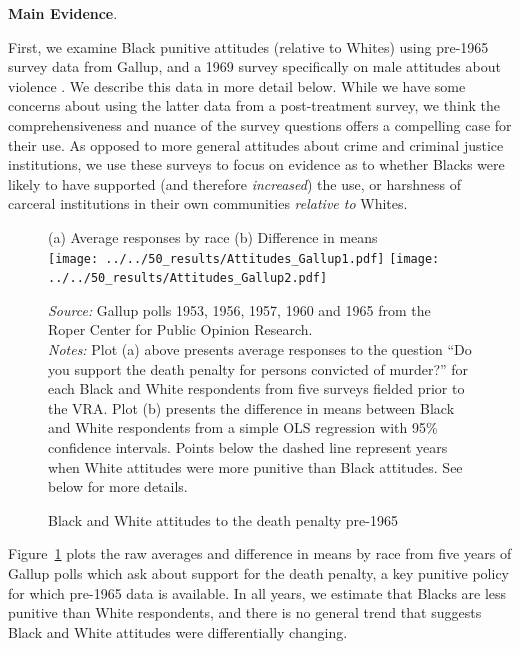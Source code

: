 \documentclass[12pt]{article}
\begin{document}
\vspace{.25in}
\textbf{Main Evidence}.

First, we examine Black punitive attitudes (relative to Whites) using pre-1965 survey data from Gallup, and a 1969 survey specifically on male attitudes about violence \citep{Violence1969}.  We describe this data in more detail below.  While we have some concerns about using the latter data from a post-treatment survey, we think the comprehensiveness and nuance of the survey questions offers a compelling case for their use.  As opposed to more general attitudes about crime and criminal justice institutions, we use these surveys to focus on evidence as to whether Blacks were likely to have supported (and therefore \emph{increased}) the use, or harshness of carceral institutions in their own communities \emph{relative to} Whites.

\begin{figure}[h!]
 \begin{center}
 \caption{Black and White attitudes to the death penalty pre-1965}
 \smallskip \smallskip
 \small
 			(a) Average responses by race  \hspace*{1.2in} (b) Difference in means \\

			\texttt{[image: ../../50\_results/Attitudes\_Gallup1.pdf]}
			\texttt{[image: ../../50\_results/Attitudes\_Gallup2.pdf]} \\
			\label{figure_attitudes1}
			 \end{center}
{\scriptsize{\emph{Source:} Gallup polls 1953, 1956, 1957, 1960 and 1965 from the Roper Center for Public Opinion Research.  }} \\
{\scriptsize{\emph{Notes:} Plot (a) above presents average responses to the question ``Do you support the death penalty for persons convicted of murder?'' for each Black and White respondents from five surveys fielded prior to the VRA.  Plot (b) presents the difference in means between Black and White respondents from a simple OLS regression with 95\% confidence intervals.  Points below the dashed line represent years when White attitudes were more punitive than Black attitudes. See below for more details. \singlespacing }}
			\end{figure} \normalsize




Figure~\ref{figure_attitudes1} plots the raw averages and difference in means by race from five years of Gallup polls which ask about support for the death penalty, a key punitive policy for which pre-1965 data is available.  In all years, we estimate that Blacks are less punitive than White respondents, and there is no general trend that suggests Black and White attitudes were differentially changing.
\end{document}
